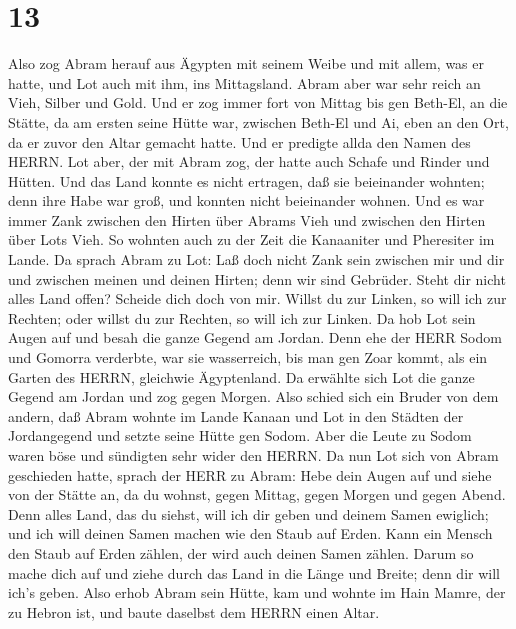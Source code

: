 \hypertarget{section-12}{%
\section{13}\label{section-12}}

 Also zog Abram herauf aus Ägypten mit seinem Weibe und mit
allem, was er hatte, und Lot auch mit ihm, ins Mittagsland. 
Abram aber war sehr reich an Vieh, Silber und Gold.  Und er
zog immer fort von Mittag bis gen Beth-El, an die Stätte, da am ersten
seine Hütte war, zwischen Beth-El und Ai,  eben an den Ort,
da er zuvor den Altar gemacht hatte. Und er predigte allda den Namen des
HERRN.  Lot aber, der mit Abram zog, der hatte auch Schafe
und Rinder und Hütten.  Und das Land konnte es nicht
ertragen, daß sie beieinander wohnten; denn ihre Habe war groß, und
konnten nicht beieinander wohnen.  Und es war immer Zank
zwischen den Hirten über Abrams Vieh und zwischen den Hirten über Lots
Vieh. So wohnten auch zu der Zeit die Kanaaniter und Pheresiter im
Lande.  Da sprach Abram zu Lot: Laß doch nicht Zank sein
zwischen mir und dir und zwischen meinen und deinen Hirten; denn wir
sind Gebrüder.  Steht dir nicht alles Land offen? Scheide
dich doch von mir. Willst du zur Linken, so will ich zur Rechten; oder
willst du zur Rechten, so will ich zur Linken.  Da hob Lot
sein Augen auf und besah die ganze Gegend am Jordan. Denn ehe der HERR
Sodom und Gomorra verderbte, war sie wasserreich, bis man gen Zoar
kommt, als ein Garten des HERRN, gleichwie Ägyptenland.  Da
erwählte sich Lot die ganze Gegend am Jordan und zog gegen Morgen. Also
schied sich ein Bruder von dem andern,  daß Abram wohnte im
Lande Kanaan und Lot in den Städten der Jordangegend und setzte seine
Hütte gen Sodom.  Aber die Leute zu Sodom waren böse und
sündigten sehr wider den HERRN.  Da nun Lot sich von Abram
geschieden hatte, sprach der HERR zu Abram: Hebe dein Augen auf und
siehe von der Stätte an, da du wohnst, gegen Mittag, gegen Morgen und
gegen Abend.  Denn alles Land, das du siehst, will ich dir
geben und deinem Samen ewiglich;  und ich will deinen Samen
machen wie den Staub auf Erden. Kann ein Mensch den Staub auf Erden
zählen, der wird auch deinen Samen zählen.  Darum so mache
dich auf und ziehe durch das Land in die Länge und Breite; denn dir will
ich's geben.  Also erhob Abram sein Hütte, kam und wohnte
im Hain Mamre, der zu Hebron ist, und baute daselbst dem HERRN einen
Altar.

